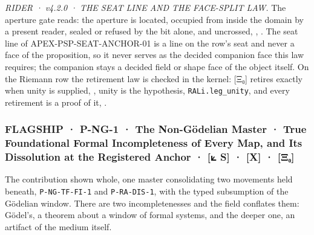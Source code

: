 \documentclass[10pt,twocolumn]{article}
\begin{document}
\emph{RIDER · v4.2.0 · THE SEAT LINE AND THE FACE-SPLIT LAW.} The
aperture gate reads: the aperture is located, occupied from inside the
domain by a present reader, sealed or refused by the bit alone, and
uncrossed, \texttt{},
\texttt{}. The seat line of
APEX-PSP-SEAT-ANCHOR-01 is a line on the row's seat and never a face of
the proposition, so it never serves as the decided companion face this
law requires; the companion stays a decided field or shape face of the
object itself. On the Riemann row the retirement law is checked in the
kernel: {[}Ξ₀{]} retires exactly when unity is supplied,
\texttt{}, unity is the
hypothesis, \texttt{RALi.leg\_unity}, and every retirement is a proof of
it, \texttt{}.

\hypertarget{flagship-p-ng-1-the-non-guxf6delian-master-true-foundational-formal-incompleteness-of-every-map-and-its-dissolution-at-the-registered-anchor-s-x-ux3beux2080}{%
\subsubsection{FLAGSHIP · P-NG-1 · The Non-Gödelian Master · True
Foundational Formal Incompleteness of Every Map, and Its Dissolution at
the Registered Anchor · {[}⟀ S{]} · {[}X{]} ·
{[}Ξ₀{]}}\label{flagship-p-ng-1-the-non-guxf6delian-master-true-foundational-formal-incompleteness-of-every-map-and-its-dissolution-at-the-registered-anchor-s-x-ux3beux2080}}

The contribution shown whole, one master consolidating two movements
held beneath, \texttt{P-NG-TF-FI-1} and \texttt{P-RA-DIS-1}, with the
typed subsumption of the Gödelian window. There are two incompletenesses
and the field conflates them: Gödel's, a theorem about a window of
formal systems, and the deeper one, an artifact of the medium itself.
\end{document}
